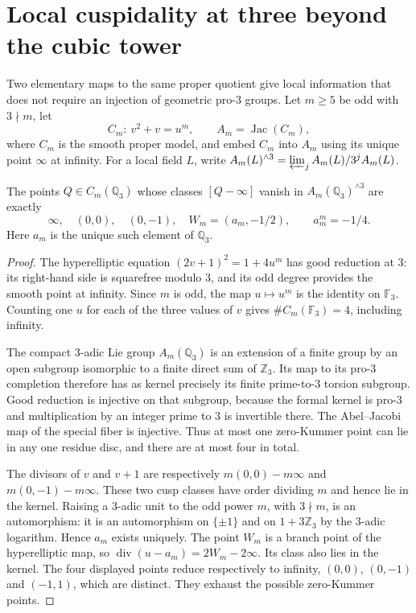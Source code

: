 \section{Local cuspidality at three beyond the cubic tower}
\label{sec:localthree}

Two elementary maps to the same proper quotient give local information
that does not require an injection of geometric pro-$3$ groups.
Let $m\ge5$ be odd with $3\nmid m$, let
\[
 C_m:\ v^2+v=u^m,\qquad A_m=\operatorname{Jac}(C_m),
\]
where $C_m$ is the smooth proper model, and embed $C_m$ into $A_m$
using its unique point $\infty$ at infinity.
For a local field $L$, write $A_m(L)^{\wedge3}=\varprojlim_j
A_m(L)/3^jA_m(L)$.

\begin{lemma}\label{lem:fourzero}
The points $Q\in C_m(\mathbb Q_3)$ whose classes $[Q-\infty]$ vanish
in $A_m(\mathbb Q_3)^{\wedge3}$ are exactly
\[
 \infty,\quad (0,0),\quad(0,-1),\quad
 W_m=(a_m,-1/2),\qquad a_m^m=-1/4.
\]
Here $a_m$ is the unique such element of $\mathbb Q_3$.
\end{lemma}
\begin{proof}
The hyperelliptic equation $(2v+1)^2=1+4u^m$ has good reduction at
$3$: its right-hand side is squarefree modulo $3$, and its odd degree
provides the smooth point at infinity. Since $m$ is odd, the map
$u\mapsto u^m$ is the identity on $\mathbb F_3$. Counting one $u$ for
each of the three values of $v$ gives
$\#C_m(\mathbb F_3)=4$, including infinity.

The compact $3$-adic Lie group $A_m(\mathbb Q_3)$ is an extension of
a finite group by an open subgroup isomorphic to a finite direct sum
of $\mathbb Z_3$. Its map to its pro-$3$ completion therefore has as
kernel precisely its finite prime-to-$3$ torsion subgroup. Good
reduction is injective on that subgroup, because the formal kernel
is pro-$3$ and multiplication by an integer prime to $3$ is invertible
there. The Abel--Jacobi map of the special fiber is injective. Thus at
most one zero-Kummer point can lie in any one residue disc, and there
are at most four in total.

The divisors of $v$ and $v+1$ are respectively
$m(0,0)-m\infty$ and $m(0,-1)-m\infty$. These two cusp classes have
order dividing $m$ and hence lie in the kernel. Raising a $3$-adic unit
to the odd power $m$, with $3\nmid m$, is an automorphism: it is an
automorphism on $\{\pm1\}$ and on $1+3\mathbb Z_3$ by the $3$-adic
logarithm. Hence $a_m$ exists uniquely. The point $W_m$ is a branch
point of the hyperelliptic map, so
$\operatorname{div}(u-a_m)=2W_m-2\infty$. Its class also lies in the
kernel. The four displayed points reduce respectively to infinity,
$(0,0)$, $(0,-1)$ and $(-1,1)$, which are distinct. They exhaust the
possible zero-Kummer points.
\end{proof}

